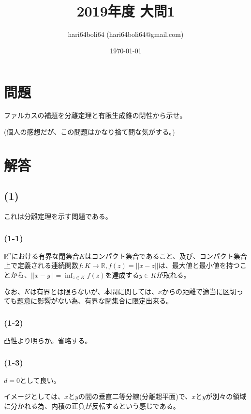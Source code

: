 \documentclass[a4paper, 10pt, dvipdfmx]{jlreq}
\begin{document}
\title{2019年度 大問1}
\author{hari64boli64 (hari64boli64@gmail.com)}
\date{\today}
\maketitle


\section{問題}

ファルカスの補題を分離定理と有限生成錐の閉性から示せ。

(個人の感想だが、この問題はかなり捨て問な気がする。)

\section{解答}

\subsection*{(1)}

これは分離定理を示す問題である。

\subsubsection*{(1-1)}

$\mathbb{R}^n$における有界な閉集合$K$はコンパクト集合であること、及び、コンパクト集合上で定義される連続関数$f\colon K \to \mathbb{R},f(z)=||x-z||$は、最大値と最小値を持つことから、$||x-y||=\inf_{z\in K}f(z)$を達成する$y \in K$が取れる。

なお、$K$は有界とは限らないが、本問に関しては、$x$からの距離で適当に区切っても題意に影響がない為、有界な閉集合に限定出来る。

\subsubsection*{(1-2)}

凸性より明らか。省略する。

\subsubsection*{(1-3)}

$d=0$として良い。

イメージとしては、$x$と$y$の間の垂直二等分線(分離超平面)で、$x$と$y$が別々の領域に分かれる為、内積の正負が反転するという感じである。
\end{document}
